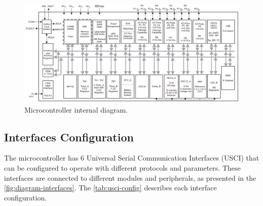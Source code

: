 \begin{figure}[!ht]
    \begin{center}
        \includegraphics[width=\textwidth]{figures/msp430-diagram.png}
        \caption{Microcontroller internal diagram.}
        \label{fig:msp430-diagram}
    \end{center}
\end{figure}

\subsection{Interfaces Configuration}

The microcontroller has 6 Universal Serial Communication Interfaces (USCI) that can be configured to operate with different protocols and parameters. These interfaces are connected to different modules and peripherals, as presented in the \autoref{fig:diagram-interfaces}. The \autoref{tab:usci-config} describes each interface configuration.

